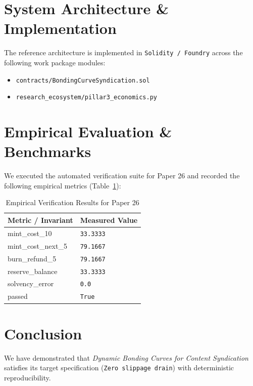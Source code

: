 \documentclass[10pt,twocolumn]{article}
\begin{document}
\section{System Architecture \& Implementation}
The reference architecture is implemented in \texttt{Solidity / Foundry} across the following work package modules:
\begin{itemize}
  \item \texttt{contracts/BondingCurveSyndication.sol}
  \item \texttt{research\_ecosystem/pillar3\_economics.py}
\end{itemize}

\section{Empirical Evaluation \& Benchmarks}
We executed the automated verification suite for Paper 26 and recorded the following empirical metrics (Table~\ref{tab:metrics}):

\begin{table}[htbp]
\centering
\caption{Empirical Verification Results for Paper 26}
\label{tab:metrics}
\begin{tabular}{ll}
\toprule
\textbf{Metric / Invariant} & \textbf{Measured Value} \\
\midrule
    mint\_cost\_10 & \texttt{33.3333} \\
    mint\_cost\_next\_5 & \texttt{79.1667} \\
    burn\_refund\_5 & \texttt{79.1667} \\
    reserve\_balance & \texttt{33.3333} \\
    solvency\_error & \texttt{0.0} \\
    passed & \texttt{True} \\
\bottomrule
\end{tabular}
\end{table}

\section{Conclusion}
We have demonstrated that \textit{Dynamic Bonding Curves for Content Syndication} satisfies its target specification (\texttt{Zero slippage drain}) with deterministic reproducibility.



\end{document}
